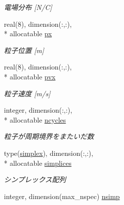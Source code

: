 \begin{DoxyCompactItemize}
\begin{DoxyCompactList}\small\item\em 電場分布 \mbox{[}N/\-C\mbox{]} \end{DoxyCompactList}\item 
\hypertarget{classcommons_ae732d0838d111f4bc28aca13448208b4}{real(8), dimension(\-:,\-:), \\*
allocatable \hyperlink{classcommons_ae732d0838d111f4bc28aca13448208b4}{px}}\label{classcommons_ae732d0838d111f4bc28aca13448208b4}

\begin{DoxyCompactList}\small\item\em 粒子位置 \mbox{[}m\mbox{]} \end{DoxyCompactList}\item 
\hypertarget{classcommons_ae255dc986228808567b476e29d2795c7}{real(8), dimension(\-:,\-:), \\*
allocatable \hyperlink{classcommons_ae255dc986228808567b476e29d2795c7}{pvx}}\label{classcommons_ae255dc986228808567b476e29d2795c7}

\begin{DoxyCompactList}\small\item\em 粒子速度 \mbox{[}m/s\mbox{]} \end{DoxyCompactList}\item 
\hypertarget{classcommons_aa5668203db8562f3bd7b1de3ac549964}{integer, dimension(\-:,\-:), \\*
allocatable \hyperlink{classcommons_aa5668203db8562f3bd7b1de3ac549964}{ncycles}}\label{classcommons_aa5668203db8562f3bd7b1de3ac549964}

\begin{DoxyCompactList}\small\item\em 粒子が周期境界をまたいだ数 \end{DoxyCompactList}\item 
\hypertarget{classcommons_ad47cfad9cd641aeac0584b2fbbdafd0d}{type(\hyperlink{structcommons_1_1simplex}{simplex}), dimension(\-:,\-:), \\*
allocatable \hyperlink{classcommons_ad47cfad9cd641aeac0584b2fbbdafd0d}{simplices}}\label{classcommons_ad47cfad9cd641aeac0584b2fbbdafd0d}

\begin{DoxyCompactList}\small\item\em シンプレックス配列 \end{DoxyCompactList}\item 
\hypertarget{classcommons_a344784e347591df0f4a2c9ed3a72d06b}{integer, dimension(max\-\_\-nspec) \hyperlink{classcommons_a344784e347591df0f4a2c9ed3a72d06b}{nsimp}}\label{classcommons_a344784e347591df0f4a2c9ed3a72d06b}


\end{DoxyCompactItemize}
